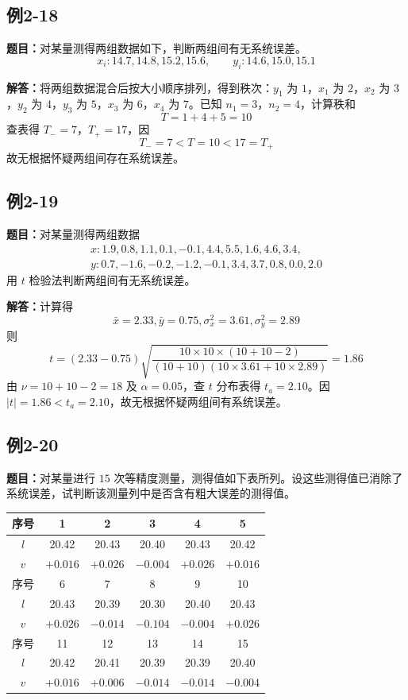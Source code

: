 \documentclass[UTF8,zihao=-4]{ctexart}
\newcommand{\problem}[1]{\subsection*{#1}}
\newcommand{\timu}{\noindent\textbf{题目：}}
\newcommand{\jieda}{\noindent\textbf{解答：}}
\begin{document}
\problem{例2-18}
\timu 对某量测得两组数据如下，判断两组间有无系统误差。
\begin{equation*}
    x_i:14.7,	14.8,	15.2,	15.6,
    \qquad
    y_i:14.6,	15.0,	15.1
\end{equation*}

\jieda 将两组数据混合后按大小顺序排列，得到秩次：$y_1$ 为 $1$，$x_1$ 为 $2$，$x_2$ 为 $3$，$y_2$ 为 $4$，$y_3$ 为 $5$，$x_3$ 为 $6$，$x_4$ 为 $7$。已知 $n_1=3$，$n_2=4$，计算秩和
\begin{equation*}
    T=1+4+5=10
\end{equation*}
查表得 $T_-=7$，$T_+=17$，因
\begin{equation*}
    T_-=7<T=10<17=T_+
\end{equation*}
故无根据怀疑两组间存在系统误差。

\newpage

\problem{例2-19}
\timu 对某量测得两组数据
\begin{equation*}
\begin{gathered}
    x:1.9,	0.8,	1.1,	0.1,	-0.1,	4.4,	5.5,	1.6,	4.6,	3.4,\\
    y:0.7,	-1.6,	-0.2,	-1.2,	-0.1,	3.4,	3.7,	0.8,	0.0,	2.0
\end{gathered}
\end{equation*}
用 $t$ 检验法判断两组间有无系统误差。

\jieda 计算得
\begin{equation*}
    \bar{x}=2.33,	\bar{y}=0.75,	\sigma_x^2=3.61,	\sigma_y^2=2.89
\end{equation*}
则
\begin{equation*}
    t=(2.33-0.75)\sqrt{\frac{10\times10\times(10+10-2)}{(10+10)(10\times3.61+10\times2.89)}}=1.86
\end{equation*}
由 $\nu=10+10-2=18$ 及 $\alpha=0.05$，查 $t$ 分布表得 $t_a=2.10$。因 $|t|=1.86<t_a=2.10$，故无根据怀疑两组间有系统误差。

\problem{例2-20}
\timu 对某量进行 $15$ 次等精度测量，测得值如下表所列。设这些测得值已消除了系统误差，试判断该测量列中是否含有粗大误差的测得值。

\begin{center}
\scriptsize
\setlength{\tabcolsep}{7pt}
\begin{tabular}{c|ccccc}
\toprule
序号 & 1 & 2 & 3 & 4 & 5\\
\midrule
$l$ & 20.42 & 20.43 & 20.40 & 20.43 & 20.42\\
$v$ & $+0.016$ & $+0.026$ & $-0.004$ & $+0.026$ & $+0.016$\\
\midrule
序号 & 6 & 7 & 8 & 9 & 10\\
\midrule
$l$ & 20.43 & 20.39 & 20.30 & 20.40 & 20.43\\
$v$ & $+0.026$ & $-0.014$ & $-0.104$ & $-0.004$ & $+0.026$\\
\midrule
序号 & 11 & 12 & 13 & 14 & 15\\
\midrule
$l$ & 20.42 & 20.41 & 20.39 & 20.39 & 20.40\\
$v$ & $+0.016$ & $+0.006$ & $-0.014$ & $-0.014$ & $-0.004$\\
\bottomrule
\end{tabular}
\end{center}
\end{document}
